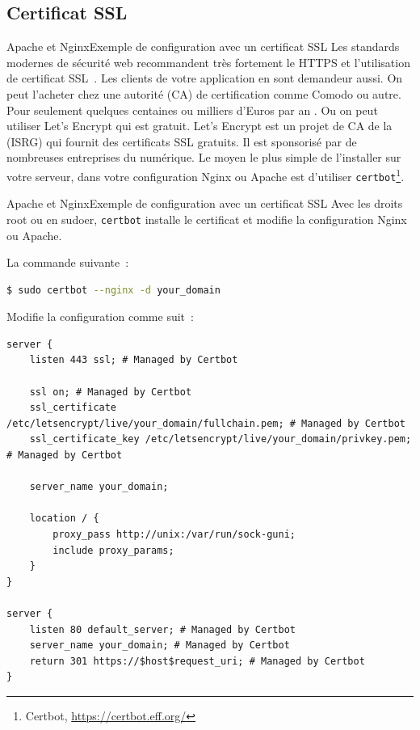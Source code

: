 \documentclass{beamer}
\begin{document}
    \subsection{Certificat SSL}\label{subsec:certificat-ssl}
    \begin{frame}{Apache et Nginx}{Exemple de configuration avec un certificat SSL}
        Les standards modernes de sécurité web recommandent très fortement le HTTPS et l'utilisation de certificat SSL~.
        Les clients de votre application en sont demandeur aussi.
        \bigbreak
        On peut l'acheter chez une autorité (CA) de certification comme Comodo ou autre.
        Pour seulement quelques centaines ou milliers d'Euros par an .
        Ou on peut utiliser Let's Encrypt qui est gratuit.
        \bigbreak
        Let's Encrypt est un projet de CA de la  (ISRG) qui fournit des certificats SSL gratuits.
        Il est sponsorisé par de nombreuses entreprises du numérique.
        \bigbreak
        Le moyen le plus simple de l'installer sur votre serveur, dans votre configuration Nginx ou Apache est d'utiliser \lstinline{certbot}\footnote{Certbot, \url{https://certbot.eff.org/}}.
    \end{frame}

    \begin{frame}[fragile]{Apache et Nginx}{Exemple de configuration avec un certificat SSL}
        Avec les droits root ou en sudoer, \lstinline{certbot} installe le certificat et modifie la configuration Nginx ou Apache.

        La commande suivante~:
        \begin{lstlisting}[language=bash,basicstyle=\ttfamily\tiny]
$ sudo certbot --nginx -d your_domain
        \end{lstlisting}
        Modifie la configuration comme suit~:
        \begin{lstlisting}[basicstyle=\ttfamily\tiny]
server {
    listen 443 ssl; # Managed by Certbot

    ssl on; # Managed by Certbot
    ssl_certificate     /etc/letsencrypt/live/your_domain/fullchain.pem; # Managed by Certbot
    ssl_certificate_key /etc/letsencrypt/live/your_domain/privkey.pem; # Managed by Certbot

    server_name your_domain;

    location / {
        proxy_pass http://unix:/var/run/sock-guni;
        include proxy_params;
    }
}

server {
    listen 80 default_server; # Managed by Certbot
    server_name your_domain; # Managed by Certbot
    return 301 https://$host$request_uri; # Managed by Certbot
}
        \end{lstlisting}
    \end{frame}
\end{document}
